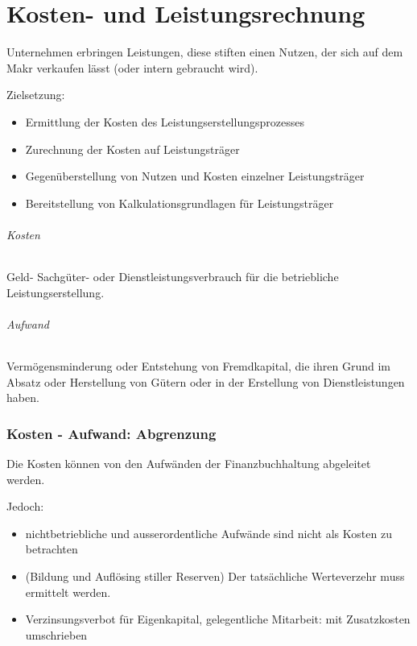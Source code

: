
\part*{Kosten- und Leistungsrechnung}

Unternehmen erbringen Leistungen, diese stiften einen Nutzen, der
sich auf dem Makr verkaufen lässt (oder intern gebraucht wird).

Zielsetzung:
\begin{itemize}
\item Ermittlung der Kosten des Leistungserstellungsprozesses
\item Zurechnung der Kosten auf Leistungsträger
\item Gegenüberstellung von Nutzen und Kosten einzelner Leistungsträger
\item Bereitstellung von Kalkulationsgrundlagen für Leistungsträger
\end{itemize}

\paragraph*{Kosten}

Geld- Sachgüter- oder Dienstleistungsverbrauch für die betriebliche
Leistungserstellung.


\paragraph*{Aufwand}

Vermögensminderung oder Entstehung von Fremdkapital, die ihren Grund
im Absatz oder Herstellung von Gütern oder in der Erstellung von Dienstleistungen
haben.


\section*{Kosten - Aufwand: Abgrenzung}

Die Kosten können von den Aufwänden der Finanzbuchhaltung abgeleitet
werden.

Jedoch: 
\begin{itemize}
\item nichtbetriebliche und ausserordentliche Aufwände sind nicht als Kosten
zu betrachten
\item (Bildung und Auflösing stiller Reserven) Der tatsächliche Werteverzehr
muss ermittelt werden.
\item Verzinsungsverbot für Eigenkapital, gelegentliche Mitarbeit: mit Zusatzkosten
umschrieben
\end{itemize}

